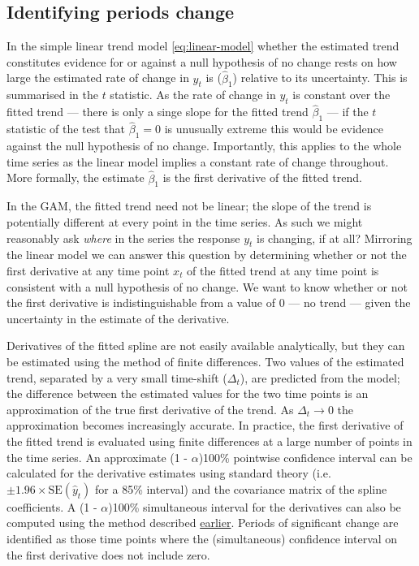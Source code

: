 \documentclass[12pt,]{article}
\begin{document}
\subsection{Identifying periods
change}\label{identifying-periods-change}

In the simple linear trend model \eqref{eq:linear-model} whether the
estimated trend constitutes evidence for or against a null hypothesis of
no change rests on how large the estimated rate of change in \(y_t\) is
(\(\hat{\beta}_1\)) relative to its uncertainty. This is summarised in
the \(t\) statistic. As the rate of change in \(y_t\) is constant over
the fitted trend --- there is only a singe slope for the fitted trend
\(\hat{\beta}_1\) --- if the \(t\) statistic of the test that
\(\hat{\beta}_1 = 0\) is unusually extreme this would be evidence
against the null hypothesis of no change. Importantly, this applies to
the whole time series as the linear model implies a constant rate of
change throughout. More formally, the estimate \(\hat{\beta}_1\) is the
first derivative of the fitted trend.

In the GAM, the fitted trend need not be linear; the slope of the trend
is potentially different at every point in the time series. As such we
might reasonably ask \emph{where} in the series the response \(y_t\) is
changing, if at all? Mirroring the linear model we can answer this
question by determining whether or not the first derivative at any time
point \(x_t\) of the fitted trend at any time point is consistent with a
null hypothesis of no change. We want to know whether or not the first
derivative is indistinguishable from a value of \(0\) --- no trend ---
given the uncertainty in the estimate of the derivative.

Derivatives of the fitted spline are not easily available analytically,
but they can be estimated using the method of finite differences. Two
values of the estimated trend, separated by a very small time-shift
(\(\Delta_t\)), are predicted from the model; the difference between the
estimated values for the two time points is an approximation of the true
first derivative of the trend. As \(\Delta_t \rightarrow 0\) the
approximation becomes increasingly accurate. In practice, the first
derivative of the fitted trend is evaluated using finite differences at
a large number of points in the time series. An approximate (1 -
\(\alpha\))100\% pointwise confidence interval can be calculated for the
derivative estimates using standard theory
(i.e.~\(\pm 1.96 \times \text{SE}(\hat{y}_t)\) for a 85\% interval) and
the covariance matrix of the spline coefficients. A (1 -
\(\alpha\))100\% simultaneous interval for the derivatives can also be
computed using the method described
\protect\hyperlink{confints}{earlier}. Periods of significant change are
identified as those time points where the (simultaneous) confidence
interval on the first derivative does not include zero.
\end{document}

